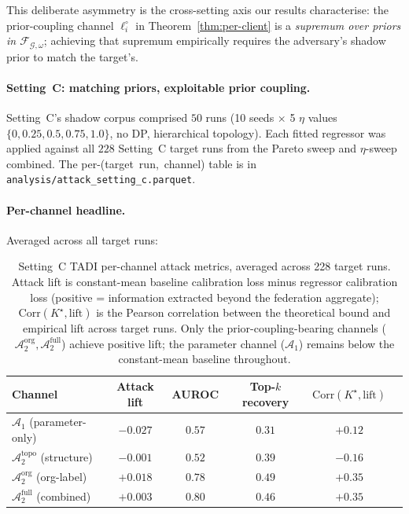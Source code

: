 \documentclass[letterpaper,journal]{IEEEtran}
\newcommand{\TADI}{\textsc{TADI}\xspace}
\newcommand{\Adv}{\mathcal{A}}
\newcommand{\TOPO}{\mathcal{G}}
\newcommand{\FAM}{\mathcal{F}}
\begin{document}
This deliberate asymmetry is the cross-setting axis our results
characterise: the prior-coupling channel $\ell_i^\circ$ in
Theorem~\ref{thm:per-client} is a \emph{supremum over priors in
$\FAM_{\TOPO,\omega}$}; achieving that supremum empirically requires
the adversary's shadow prior to match the target's.

\paragraph{Setting~C: matching priors, exploitable prior coupling.}
Setting~C's shadow corpus comprised $50$ runs (10 seeds $\times$
5 $\eta$ values $\{0, 0.25, 0.5, 0.75, 1.0\}$, no DP, hierarchical
topology). Each fitted regressor was applied against all $228$
Setting~C target runs from the Pareto sweep and $\eta$-sweep combined.
The per-(target~run,~channel) table is in
\texttt{analysis/attack\_setting\_c.parquet}.

\paragraph{Per-channel headline.}
Averaged across all target runs:

\begin{table}[h]
\centering
\begin{tabular}{@{}lccccc@{}}
\toprule
Channel & Attack lift & AUROC & Top-$k$ recovery & $\mathrm{Corr}(K^\star, \text{lift})$ \\
\midrule
$\Adv_1$ (parameter-only)         & $-0.027$ &  $0.57$ & $0.31$ & $+0.12$ \\
$\Adv_2^{\text{topo}}$ (structure) & $-0.001$ &  $0.52$ & $0.39$ & $-0.16$ \\
$\Adv_2^{\text{org}}$ (org-label)  & $+0.018$ &  $0.78$ & $0.49$ & $+0.35$ \\
$\Adv_2^{\text{full}}$ (combined)  & $+0.003$ &  $0.80$ & $0.46$ & $+0.35$ \\
\bottomrule
\end{tabular}
\caption{Setting~C \TADI per-channel attack metrics, averaged across
228 target runs. Attack lift is constant-mean baseline calibration loss
minus regressor calibration loss (positive = information extracted
beyond the federation aggregate); $\mathrm{Corr}(K^\star, \text{lift})$
is the Pearson correlation between the theoretical bound and empirical
lift across target runs. Only the prior-coupling-bearing channels
($\Adv_2^{\text{org}}, \Adv_2^{\text{full}}$) achieve positive lift;
the parameter channel ($\Adv_1$) remains below the constant-mean
baseline throughout.}
\label{tab:channels-c}
\end{table}
\end{document}
